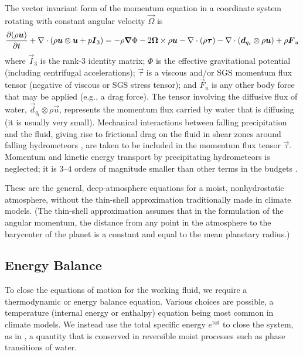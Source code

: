 \documentclass{article}
\begin{document}
The vector invariant form of the momentum equation in a coordinate system rotating with constant angular velocity $\vec{\Omega}$ is 
\begin{equation}
\frac{\partial (\rho\boldsymbol{{u}})}{\partial t} + \nabla \cdot \left( \rho\boldsymbol{{u}} \otimes \boldsymbol{{u}} + p \boldsymbol{{I}}_3\right) =  - \rho \boldsymbol{{\nabla}}\Phi - 2\boldsymbol{{\Omega}} \times \rho\boldsymbol{{u}} - \nabla \cdot (\rho \boldsymbol{{\tau}}) - \nabla \cdot\left( \boldsymbol{{d}}_{q_t} \otimes \rho\boldsymbol{{u}} \right) + \rho \boldsymbol{{F}}_u
\label{eq:governing_equations/momentum}
\end{equation}
where $\vec{I}_3$ is the rank-3 identity matrix; $\Phi$ is the effective gravitational potential (including centrifugal accelerations); $\vec{\tau}$ is a viscous and/or SGS momentum flux tensor (negative of viscous or SGS stress tensor); and $\vec{F}_u$ is any other body force that may be applied (e.g., a drag force). The tensor involving the diffusive flux of water, $\vec{d}_{q_t} \otimes \rho\vec{u}$, represents the momentum flux carried by water that is diffusing (it is usually very small). Mechanical interactions between falling precipitation and the fluid, giving rise to frictional drag on the fluid in shear zones around falling hydrometeors \citep{Pauluis00}, are taken to be included in the momentum flux tensor $\vec{\tau}$. Momentum and kinetic energy transport by precipitating hydrometeors is neglected; it is 3--4 orders of magnitude smaller than other terms in the budgets \citep{Romps08a}.

These are the general, deep-atmosphere equations for a moist, nonhydrostatic atmosphere, without the thin-shell approximation traditionally made in climate models. (The thin-shell approximation assumes that in the formulation of the angular momentum, the distance from any point in the atmosphere to the barycenter of the planet is a constant and equal to the mean planetary radius.)

\subsection{Energy Balance}

To close the equations of motion for the working fluid, we require a thermodynamic or energy balance equation. Various choices are possible, a temperature (internal energy or enthalpy) equation being most common in climate models. We instead use the total specific energy $e^\mathrm{tot}$ to close the system, as in \citet{Romps08a}, a quantity that is conserved in reversible moist processes such as phase transitions of water. 
\end{document}
